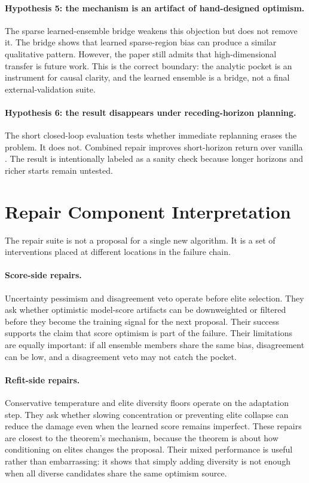 \paragraph{Hypothesis 5: the mechanism is an artifact of hand-designed
optimism.}
The sparse learned-ensemble bridge weakens this objection but does not remove
it. The bridge shows that learned sparse-region bias can produce a similar
qualitative pattern. However, the paper still admits that high-dimensional
transfer is future work. This is the correct boundary: the analytic pocket is
an instrument for causal clarity, and the learned ensemble is a bridge, not a
final external-validation suite.

\paragraph{Hypothesis 6: the result disappears under receding-horizon
planning.}
The short closed-loop evaluation tests whether immediate replanning erases the
problem. It does not. Combined repair improves short-horizon return over
vanilla \cem{}. The result is intentionally labeled as a sanity check because
longer horizons and richer starts remain untested.

\section{Repair Component Interpretation}
\label{app:repair-interpretation}

The repair suite is not a proposal for a single new algorithm. It is a set of
interventions placed at different locations in the failure chain.

\paragraph{Score-side repairs.}
Uncertainty pessimism and disagreement veto operate before elite selection.
They ask whether optimistic model-score artifacts can be downweighted or
filtered before they become the training signal for the next proposal. Their
success supports the claim that score optimism is part of the failure. Their
limitations are equally important: if all ensemble members share the same
bias, disagreement can be low, and a disagreement veto may not catch the
pocket.

\paragraph{Refit-side repairs.}
Conservative temperature and elite diversity floors operate on the adaptation
step. They ask whether slowing concentration or preventing elite collapse can
reduce the damage even when the learned score remains imperfect. These repairs
are closest to the theorem's mechanism, because the theorem is about how
conditioning on elites changes the proposal. Their mixed performance is useful
rather than embarrassing: it shows that simply adding diversity is not enough
when all diverse candidates share the same optimism source.

